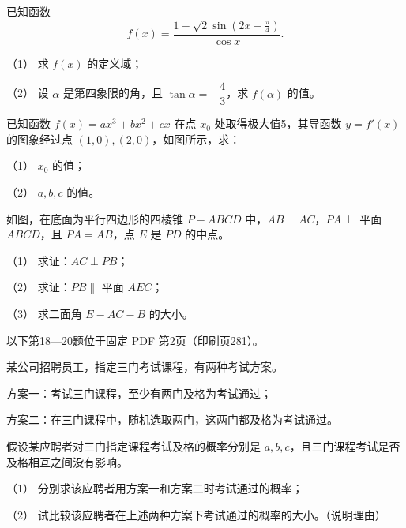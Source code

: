 \begin{question}
已知函数
\nopagebreak[4]
\[
f(x)=\frac{1-\sqrt2\sin\left(2x-\frac\pi4\right)}{\cos x}.
\]

（1） 求 $f(x)$ 的定义域；

（2） 设 $\alpha$ 是第四象限的角，且 $\tan\alpha=-\dfrac43$，求 $f(\alpha)$ 的值。

\Needspace{0.4\textheight}
\end{question}
\begin{question}
已知函数 $f(x)=ax^3+bx^2+cx$ 在点 $x_0$ 处取得极大值5，其导函数 $y=f'(x)$ 的图象经过点 $(1,0),(2,0)$，如图所示，求：

（1） $x_0$ 的值；

（2） $a,b,c$ 的值。
\nopagebreak[4]
\begin{center}\end{center}
\nopagebreak[4]
\Needspace{0.4\textheight}
\end{question}
\begin{question}
如图，在底面为平行四边形的四棱锥 $P-ABCD$ 中，$AB\perp AC$，$PA\perp$ 平面 $ABCD$，且 $PA=AB$，点 $E$ 是 $PD$ 的中点。

（1） 求证：$AC\perp PB$；

（2） 求证：$PB\parallel$ 平面 $AEC$；

（3） 求二面角 $E-AC-B$ 的大小。
\nopagebreak[4]
\begin{center}\end{center}
\nopagebreak[4]
\begin{gktip}
以下第18—20题位于固定 PDF 第2页（印刷页281）。
\end{gktip}

\end{question}
\begin{question}
某公司招聘员工，指定三门考试课程，有两种考试方案。

方案一：考试三门课程，至少有两门及格为考试通过；

方案二：在三门课程中，随机选取两门，这两门都及格为考试通过。

假设某应聘者对三门指定课程考试及格的概率分别是 $a,b,c$，且三门课程考试是否及格相互之间没有影响。

（1） 分别求该应聘者用方案一和方案二时考试通过的概率；

（2） 试比较该应聘者在上述两种方案下考试通过的概率的大小。（说明理由）

\end{question}

